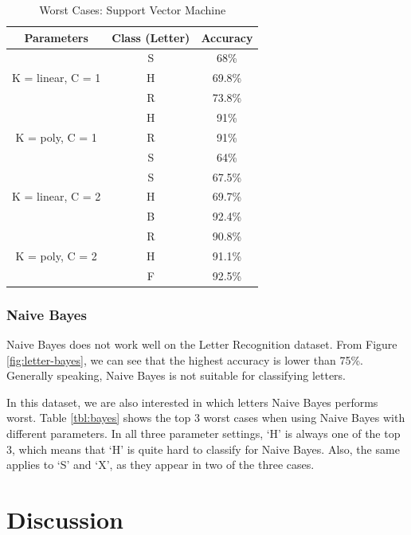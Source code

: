 \documentclass[11pt]{article}
\begin{document}
\begin{table}
\centering
\begin{tabular}{c  c  c} \hline

Parameters & Class (Letter) & Accuracy \\\hline
\multirow{3}{*}{K = linear, C = 1} & S & 68\% \\
	& H & 69.8\% \\
	& R & 73.8\% \\\hline
\multirow{3}{*}{K = poly, C = 1} & H & 91\% \\
	& R & 91\% \\
	& S & 64\% \\\hline
\multirow{3}{*}{K = linear, C = 2} & S & 67.5\% \\
	& H & 69.7\% \\
	& B & 92.4\% \\\hline
\multirow{3}{*}{K = poly, C = 2} & R & 90.8\% \\
	& H & 91.1\% \\
	& F & 92.5\% \\\hline
\end{tabular}
\caption{Worst Cases: Support Vector Machine} %
\label{tbl:svm}
\end{table}

\newpage

\subsubsection{Naive Bayes}
Naive Bayes does not work well on the Letter Recognition dataset. From Figure \ref{fig:letter-bayes}, we can see that the highest accuracy is lower than 75\%. Generally speaking, Naive Bayes is not suitable for classifying letters.

In this dataset, we are also interested in which letters Naive Bayes performs worst. Table \ref{tbl:bayes} shows the top 3 worst cases when using Naive Bayes with different parameters. In all three parameter settings, `H' is always one of the top 3, which means that `H' is quite hard to classify for Naive Bayes. Also, the same applies to `S' and `X', as they appear in two of the three cases.



\section{Discussion}
\end{document}

